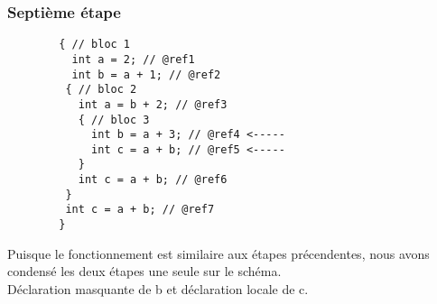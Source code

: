 \documentclass{../../res/univ-projet}
\begin{document}
    \subsubsection{Septième étape}
    \begin{multicols}{2}
        
        \begin{verbatim}
        { // bloc 1
          int a = 2; // @ref1
          int b = a + 1; // @ref2
         { // bloc 2 
           int a = b + 2; // @ref3
           { // bloc 3
             int b = a + 3; // @ref4 <-----
             int c = a + b; // @ref5 <-----
           }
           int c = a + b; // @ref6
         }
         int c = a + b; // @ref7
        }

        \end{verbatim}

      \columnbreak
        Puisque le fonctionnement est similaire aux étapes précendentes, nous avons condensé les deux étapes une seule sur le schéma.\\

        Déclaration masquante de b et déclaration locale de c.
        
      \end{multicols}
\end{document}

